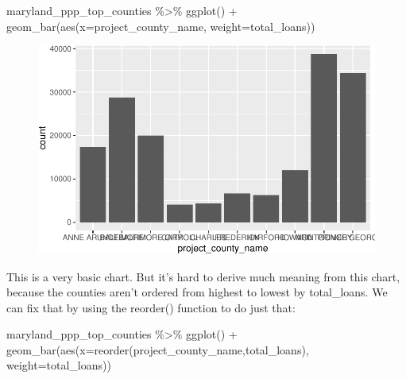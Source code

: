 \documentclass[
  letterpaper,
  DIV=11,
  numbers=noendperiod]{scrreprt}
\newenvironment{Shaded}{\begin{snugshade}}{\end{snugshade}}
\newcommand{\AttributeTok}[1]{\textcolor[rgb]{0.40,0.45,0.13}{#1}}
\newcommand{\FunctionTok}[1]{\textcolor[rgb]{0.28,0.35,0.67}{#1}}
\newcommand{\NormalTok}[1]{\textcolor[rgb]{0.00,0.23,0.31}{#1}}
\newcommand{\SpecialCharTok}[1]{\textcolor[rgb]{0.37,0.37,0.37}{#1}}
\begin{document}
\begin{Shaded}
\begin{Highlighting}[]
\NormalTok{maryland\_ppp\_top\_counties }\SpecialCharTok{\%\textgreater{}\%}
  \FunctionTok{ggplot}\NormalTok{() }\SpecialCharTok{+}
  \FunctionTok{geom\_bar}\NormalTok{(}\FunctionTok{aes}\NormalTok{(}\AttributeTok{x=}\NormalTok{project\_county\_name, }\AttributeTok{weight=}\NormalTok{total\_loans))}
\end{Highlighting}
\end{Shaded}

\begin{figure}[H]

{\centering \includegraphics{./visualizing-for-reporting_files/figure-pdf/unnamed-chunk-5-1.pdf}

}

\end{figure}

This is a very basic chart. But it's hard to derive much meaning from
this chart, because the counties aren't ordered from highest to lowest
by total\_loans. We can fix that by using the reorder() function to do
just that:

\begin{Shaded}
\begin{Highlighting}[]
\NormalTok{maryland\_ppp\_top\_counties }\SpecialCharTok{\%\textgreater{}\%}
  \FunctionTok{ggplot}\NormalTok{() }\SpecialCharTok{+}
  \FunctionTok{geom\_bar}\NormalTok{(}\FunctionTok{aes}\NormalTok{(}\AttributeTok{x=}\FunctionTok{reorder}\NormalTok{(project\_county\_name,total\_loans), }\AttributeTok{weight=}\NormalTok{total\_loans))}
\end{Highlighting}
\end{Shaded}
\end{document}
